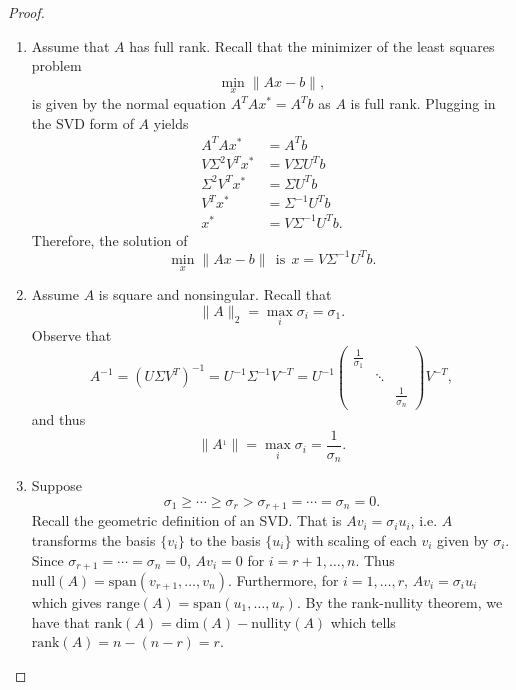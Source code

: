 \documentclass[12pt]{report}
\begin{document}
\begin{problem}
\begin{proof}
\begin{enumerate}
     \item 
     Assume that $A$ has full rank. Recall that the minimizer of the least squares problem
     \[
           \min_x \|Ax - b\|,
     \]
     is given by the normal equation $A^TA x^* = A^Tb$ as $A$ is full rank. Plugging in the SVD form of $A$ yields 
     \begin{align*}
          A^TA x^* &= A^Tb\\
          V\Sigma^2 V^T x^* &= V\Sigma U^T b\\
          \Sigma^2 V^T x^* &= \Sigma U^T b\\
          V^T x^* &= \Sigma^{-1}U^T b\\
          x^* &= V \Sigma^{-1}U^Tb.
     \end{align*}
     Therefore, the solution of
    \[
         \min_{x}\|Ax-b\| ~~ \text{is}~~ x = V\Sigma^{-1}U^Tb.
    \]

     \item
     Assume $A$ is square and nonsingular. Recall that 
     \[
           \| A \|_2 = \max_i\sigma_i = \sigma_1.
     \]
     Observe that
     \[
           A^{-1} = (U\Sigma V^T)^{-1} = U^{-1}\Sigma^{-1}V^{-T} = U^{-1} \begin{pmatrix}
               \frac{1}{\sigma_1}\\
               &\ddots\\
               &&\frac{1}{\sigma_n}
           \end{pmatrix}V^{-T},
     \]
     and thus
     \[
           \| A^{_1} \| = \max_i \sigma_i = \frac{1}{\sigma_n}.
     \]
     
     
     \item
     Suppose
     \[
           \sigma_1 \geq \cdots \geq \sigma_r > \sigma_{r+1} = \cdots = \sigma_n = 0.
     \]
     Recall the geometric definition of an SVD. That is $Av_i = \sigma_i u_i$, i.e. $A$ transforms the basis $\{v_i\}$ to the basis $\{u_i\}$ with scaling of each $v_i$ given by $\sigma_i$. Since $\sigma_{r+1} = \cdots = \sigma_n = 0$, $Av_i = 0$ for $i = r+1, \dots, n$. Thus $\text{null}(A) = \text{span}(v_{r+1},\dots,v_n)$. Furthermore, for $i = 1, \dots, r$, $Av_i = \sigma_i u_i$ which gives $\text{range}(A) = \text{span}(u_1,\dots,u_r)$. By the rank-nullity theorem, we have that $\text{rank}(A) = \text{dim}(A) - \text{nullity}(A)$ which tells $\text{rank}(A) = n - (n-r) = r$.         


\end{enumerate}
\end{proof}
\end{problem}
\end{document}
